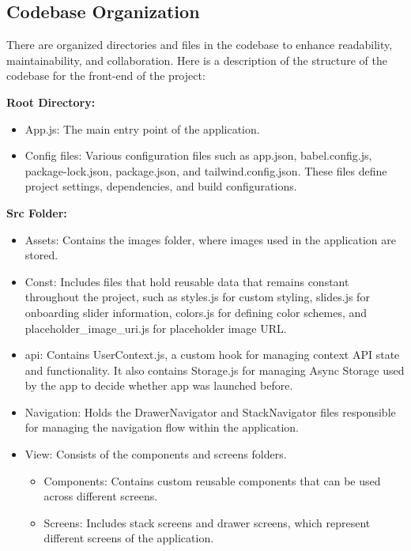 \subsection{Codebase Organization}
There are organized directories and files in the codebase to enhance readability, maintainability, and collaboration. Here is a description of the structure of the codebase for the front-end of the project:
\begin{compactenum}
    \item \textbf{Root Directory:} 
    \begin{itemize}
        \item App.js: The main entry point of the application.
        \item Config files: Various configuration files such as app.json, babel.config.js, package-lock.json, package.json, and tailwind.config.json. These files define project settings, dependencies, and build configurations.
    \end{itemize}
    \item \textbf{Src Folder:}
    \begin{itemize}
        \item Assets: Contains the images folder, where images used in the application are stored.
        \item Const: Includes files that hold reusable data that remains constant throughout the project, such as styles.js for custom styling, slides.js for onboarding slider information, colors.js for defining color schemes, and placeholder\_image\_uri.js for placeholder image URL.
        \item api: Contains UserContext.js, a custom hook for managing context API state and functionality. It also contains Storage.js for managing Async Storage used by the app to decide whether app was launched before.
        \item Navigation: Holds the DrawerNavigator and StackNavigator files responsible for managing the navigation flow within the application.
        \item View: Consists of the components and screens folders.
        \begin{itemize}
            \item Components: Contains custom reusable components that can be used across different screens.
            \item Screens: Includes stack screens and drawer screens, which represent different screens of the application.
        \end{itemize}
    \end{itemize}
\end{compactenum}
